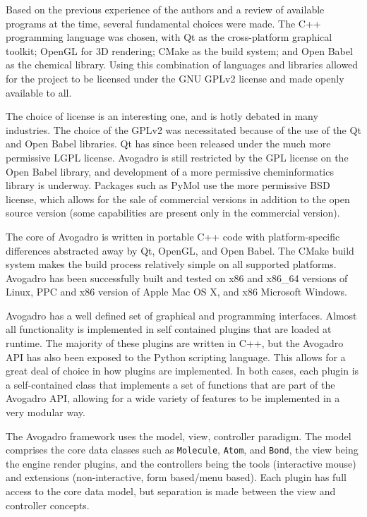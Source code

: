 \documentclass[10pt]{bmc_article}
\newenvironment{bmcformat}{\begin{raggedright}
\baselineskip20pt\sloppy\setboolean{publ}{false}}{\end{raggedright}
\baselineskip20pt\sloppy}
\begin{document}
\begin{bmcformat}
Based on the previous experience of the authors and a review of available
programs at the time, several fundamental choices were made. The C++ programming
language was chosen, with Qt as the cross-platform graphical toolkit; OpenGL for
3D rendering; CMake as the build system; and Open Babel as the chemical library.
Using this combination of languages and libraries allowed for the project to be
licensed under the GNU GPLv2 license and made openly available to all.

The choice of license is an interesting one, and is hotly debated in many
industries. The choice of the GPLv2 was necessitated because of the use of the
Qt and Open Babel libraries. Qt has since been released under the much more
permissive LGPL license. Avogadro is still restricted by the GPL
license on the Open Babel library, and development of a more
permissive cheminformatics library is underway. Packages such as PyMol
use the more permissive BSD license, which allows for the sale of
commercial versions in addition to the open source version (some
capabilities are present only in the commercial version).

The core of Avogadro is written in portable C++ code with platform-specific
differences abstracted away by Qt, OpenGL, and Open Babel. The CMake build system
makes the build process relatively simple on all supported platforms. Avogadro
has been successfully built and tested on x86 and x86\_64 versions of Linux, PPC
and x86 version of Apple Mac OS X, and x86 Microsoft Windows.

Avogadro has a well defined set of graphical and programming interfaces. Almost
all functionality is implemented in self contained plugins that are loaded at
runtime. The majority of these plugins are written in C++, but the Avogadro API
has also been exposed to the Python scripting language. This allows for a great
deal of choice in how plugins are implemented. In both cases, each plugin is a
self-contained class that implements a set of functions that are part of the
Avogadro API, allowing for a wide variety of features to be implemented in a
very modular way.

The Avogadro framework uses the model, view, controller paradigm. The model
comprises the core data classes such as {\tt Molecule}, {\tt Atom}, and
{\tt Bond}, the view being the engine render plugins, and the
controllers being the tools (interactive mouse) and extensions
(non-interactive, form based/menu based). Each plugin has full access
to the core data model, but separation is made between the view and
controller concepts.


\end{bmcformat}
\end{document}
